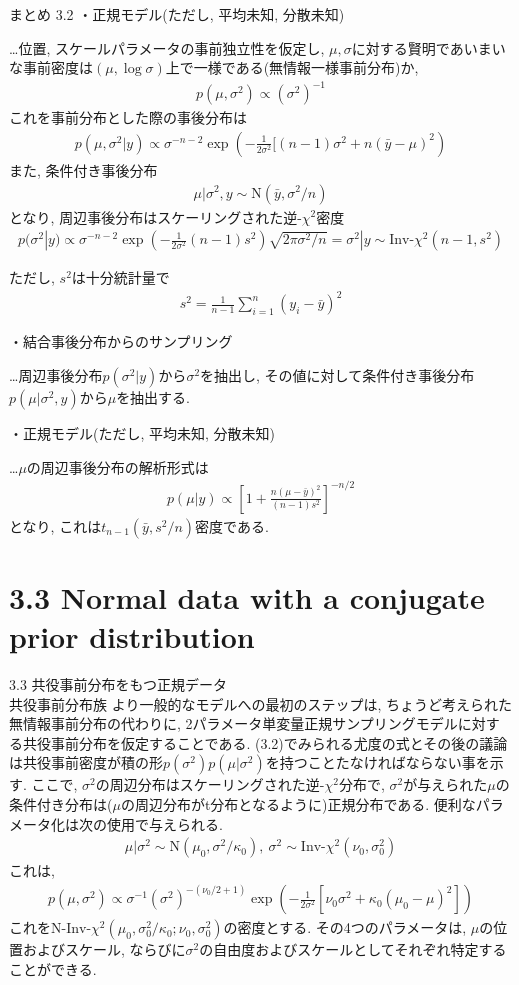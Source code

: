 \documentclass[10pt,dvipdfmx,a4]{beamer}
\newcommand{\eq}[1]{\begin{align}#1\end{align}}
\newcommand{\eqn}[1]{\begin{align*}#1\end{align*}}
\begin{document}

\begin{frame}{まとめ 3.2}
・正規モデル(ただし, 平均未知, 分散未知)

…位置, スケールパラメータの事前独立性を仮定し, $\mu, \sigma$に対する賢明であいまいな事前密度は$(\mu, \log \sigma)$上で一様である(無情報一様事前分布)か,
\eqn{p(\mu,\sigma^2)\propto (\sigma^2)^{-1}}
これを事前分布とした際の事後分布は
\eqn{p(\mu,\sigma^2|y)\propto\sigma^{-n-2}\exp\left(-\tfrac{1}{2\sigma^2}[(n-1)\sigma^2+n(\bar{y}-\mu)^2\right)}
また, 条件付き事後分布
\eqn{\mu|\sigma^2, y\sim\text{N}(\bar{y},\sigma^2/n)}
となり, 周辺事後分布はスケーリングされた逆-$\chi^2$密度
\eqn{p(\sigma^2|y)\propto \sigma^{-n-2}\exp \left(-\tfrac{1}{2\sigma^2}(n-1)s^2\right)\sqrt{2\pi\sigma^2/n}=\sigma^2|y\sim \text{Inv-}\chi^2(n-1,s^2)}
\end{frame}


\begin{frame}
ただし, $s^2$は十分統計量で
\eqn{s^2=\tfrac{1}{n-1}\sum_{i=1}^n(y_i-\bar{y})^2}

・結合事後分布からのサンプリング

…周辺事後分布$p(\sigma^2|y)$から$\sigma^2$を抽出し, その値に対して条件付き事後分布$p(\mu|\sigma^2,y)$から$\mu$を抽出する.

・正規モデル(ただし, 平均未知, 分散未知)

…$\mu$の周辺事後分布の解析形式は
\eqn{p(\mu|y)\propto \left[ 1+\frac{n(\mu-\bar{y})^2}{(n-1)s^2}\right]^{-n/2}}
となり, これは$t_{n-1}(\bar{y},s^2/n)$密度である.
\end{frame}

\section{3.3 Normal data with a conjugate prior distribution}
\begin{frame}{3.3 共役事前分布をもつ正規データ\\共役事前分布族}
より一般的なモデルへの最初のステップは, ちょうど考えられた無情報事前分布の代わりに, 2パラメータ単変量正規サンプリングモデルに対する共役事前分布を仮定することである.
(3.2)でみられる尤度の式とその後の議論は共役事前密度が積の形$p(\sigma^2)p(\mu|\sigma^2)$を持つことたなければならない事を示す.
ここで, $\sigma^2$の周辺分布はスケーリングされた逆-$\chi^2$分布で, $\sigma^2$が与えられた$\mu$の条件付き分布は($\mu$の周辺分布がt分布となるように)正規分布である.
便利なパラメータ化は次の使用で与えられる.
\eqn{\mu|\sigma^2\sim \text{N}(\mu_0,\sigma^2/\kappa_0),\ \sigma^2\sim \text{Inv-}\chi^2(\nu_0,\sigma_0^2)}
これは, 
\eq{p(\mu,\sigma^2)\propto \sigma^{-1}(\sigma^2)^{-(\nu_0/2+1)}\exp\left(-\frac{1}{2\sigma^2}[\nu_0\sigma^2+\kappa_0(\mu_0-\mu)^2]\right)}
これを$\text{N-Inv-}\chi^2(\mu_0,\sigma^2_0/\kappa_0;\nu_0,\sigma^2_0)$の密度とする.
その4つのパラメータは, $\mu$の位置およびスケール, ならびに$\sigma^2$の自由度およびスケールとしてそれぞれ特定することができる.
\end{frame}
\end{document}
